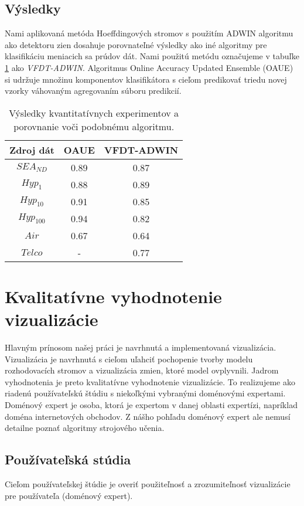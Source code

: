 \subsection{Výsledky}
Nami aplikovaná metóda Hoeffdingových stromov s použitím ADWIN algoritmu ako detektoru zien dosahuje porovnateľné výsledky ako iné algoritmy pre klasifikáciu meniacich sa prúdov dát. Nami použitú metódu označujeme v tabuľke \ref{tab-method-results} ako \textit{VFDT-ADWIN}. Algoritmus Online Accuracy Updated Ensemble (OAUE) \citep{brzezinski2014prequential} si udržuje množinu komponentov klasifikátora s cieľom predikovať triedu novej vzorky váhovaným agregovaním súboru predikcií.
\begin{table}[!htp]
\centering
\begin{tabular}{| c || c | c |}
\hline
\textbf{Zdroj dát} & \textbf{OAUE} & \textbf{VFDT-ADWIN} \\ \hline

$SEA_{ND}$ & 0.89 & 0.87 \\ \hline
$Hyp_1$ & 0.88 & 0.89 \\ \hline
$Hyp_{10}$ & 0.91 & 0.85 \\ \hline
$Hyp_{100}$ & 0.94 & 0.82 \\ \hline
$Air$ & 0.67 & 0.64 \\ \hline
$Telco$ & - & 0.77 \\ \hline

\end{tabular}
\caption{Výsledky kvantitatívnych experimentov a porovnanie voči podobnému algoritmu.}
\label{tab-method-results}
\end{table}



\section{Kvalitatívne vyhodnotenie vizualizácie}
Hlavným prínosom našej práci je navrhnutá a implementovaná vizualizácia. Vizualizácia je navrhnutá s cieľom uľahciť pochopenie tvorby modelu rozhodovacích stromov a vizualizácia zmien, ktoré model ovplyvnili. Jadrom vyhodnotenia je preto kvalitatívne vyhodnotenie vizualizácie. To realizujeme ako riadenú používateľskú štúdiu s niekoľkými vybranými doménovými expertami. Doménový expert je osoba, ktorá je expertom v danej oblasti expertízi, napríklad doména internetových obchodov. Z nášho pohľadu doménový expert ale nemusí detailne poznať algoritmy strojového učenia.

\subsection{Používateľská stúdia}
Cieľom používateľskej štúdie je overiť použiteľnosť a zrozumiteľnosť vizualizácie pre používateľa (doménový expert).










